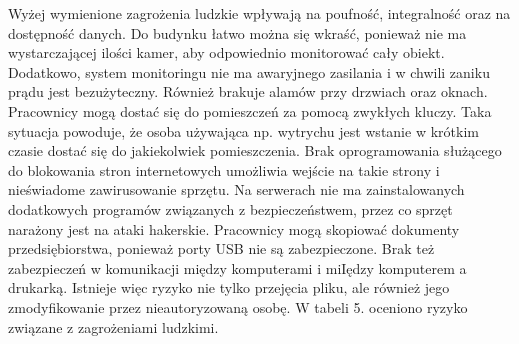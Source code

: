 Wyżej wymienione zagrożenia ludzkie wpływają na poufność, integralność oraz na dostępność danych. Do budynku łatwo można się wkraść, ponieważ nie ma wystarczającej ilości kamer, aby odpowiednio monitorować cały obiekt. Dodatkowo, system monitoringu nie ma awaryjnego zasilania i w chwili zaniku prądu jest bezużyteczny. Również brakuje alamów przy drzwiach oraz oknach. Pracownicy mogą dostać się do pomieszczeń za pomocą zwykłych kluczy. Taka sytuacja powoduje, że osoba używająca np. wytrychu jest wstanie w krótkim czasie dostać się do jakiekolwiek pomieszczenia. Brak oprogramowania służącego do blokowania stron internetowych umożliwia wejście na takie strony i nieświadome zawirusowanie sprzętu. Na serwerach nie ma zainstalowanych dodatkowych programów związanych z bezpieczeństwem, przez co sprzęt narażony jest na ataki hakerskie. Pracownicy mogą skopiować dokumenty przedsiębiorstwa, ponieważ porty USB nie są zabezpieczone. Brak też zabezpieczeń w komunikacji między komputerami i miIędzy komputerem a drukarką. Istnieje więc ryzyko nie tylko przejęcia pliku, ale również jego zmodyfikowanie przez nieautoryzowaną osobę.
W tabeli 5. oceniono ryzyko związane z zagrożeniami ludzkimi.
